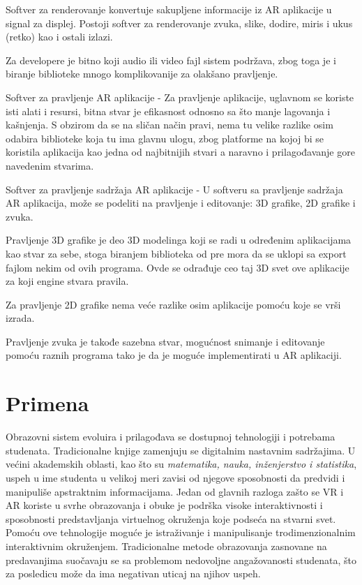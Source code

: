 \documentclass[a4paper]{article}
\begin{document}
	Softver za renderovanje konvertuje sakupljene informacije iz AR aplikacije u signal za displej. Postoji softver za renderovanje zvuka, slike, dodire, miris i 
	ukus (retko) kao i ostali izlazi.

	Za developere je bitno koji audio ili video fajl sistem podržava, zbog toga je i biranje biblioteke mnogo komplikovanije za olakšano pravljenje.

	Softver za pravljenje AR aplikacije - Za pravljenje aplikacije, uglavnom se koriste isti alati i resursi, bitna stvar je efikasnost odnosno sa što manje 
	lagovanja i kašnjenja. S obzirom da se na sličan način pravi, nema tu velike razlike osim odabira biblioteke koja tu ima glavnu ulogu, zbog platforme na kojoj 
	bi se koristila aplikacija kao jedna od najbitnijih stvari a naravno i prilagođavanje gore navedenim stvarima.

	Softver za pravljenje sadržaja AR aplikacije - U softveru sa pravljenje sadržaja AR aplikacija, može se podeliti na pravljenje i editovanje: 3D grafike, 2D 
	grafike i zvuka.

	Pravljenje 3D grafike je deo 3D modelinga koji se radi u određenim aplikacijama kao stvar za sebe, stoga biranjem biblioteka od pre mora da se uklopi sa export 
	fajlom nekim od ovih programa. Ovde se odrađuje ceo taj 3D svet ove aplikacije za koji engine stvara pravila.

	Za pravljenje 2D grafike nema veće razlike osim aplikacije pomoću koje se vrši izrada.

	Pravljenje zvuka je takođe sazebna stvar, mogućnost snimanje i editovanje pomoću raznih programa tako je da je moguće implementirati u AR aplikaciji.

	\section{Primena}
	\label{sec:Primena}
	Obrazovni sistem evoluira i prilagođava se dostupnoj tehnologiji i potrebama studenata. Tradicionalne knjige zamenjuju se digitalnim nastavnim sadržajima. 
	U većini akademskih oblasti, kao što su \emph{matematika, nauka, inženjerstvo i statistika}, uspeh u ime studenta u velikoj meri zavisi od njegove sposobnosti da 
	predvidi i manipuliše apstraktnim informacijama. Jedan od glavnih razloga zašto se VR i AR koriste u svrhe obrazovanja i obuke je podrška visoke interaktivnosti 
	i sposobnosti predstavljanja virtuelnog okruženja koje podseća na stvarni svet. Pomoću ove tehnologije moguće je istraživanje i manipulisanje trodimenzionalnim 
	interaktivnim okruženjem. Tradicionalne metode obrazovanja zasnovane na predavanjima suočavaju se sa problemom nedovoljne  angažovanosti studenata, što za posledicu 
	može da ima negativan uticaj na njihov uspeh.
\end{document}
